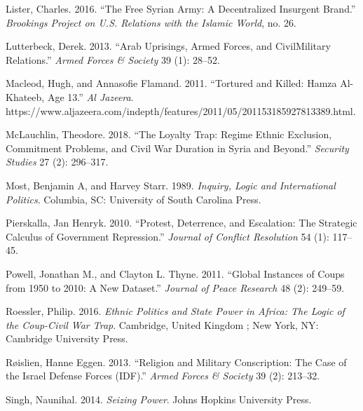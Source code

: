 \documentclass[12pt,]{article}
\begin{document}
\leavevmode\hypertarget{ref-Lister2016}{}%
Lister, Charles. 2016. ``The Free Syrian Army: A Decentralized Insurgent Brand.'' \emph{Brookings Project on U.S. Relations with the Islamic World}, no. 26.

\leavevmode\hypertarget{ref-Lutterbeck2013}{}%
Lutterbeck, Derek. 2013. ``Arab Uprisings, Armed Forces, and CivilMilitary Relations.'' \emph{Armed Forces \& Society} 39 (1): 28--52.

\leavevmode\hypertarget{ref-Macleod2011}{}%
Macleod, Hugh, and Annasofie Flamand. 2011. ``Tortured and Killed: Hamza Al-Khateeb, Age 13.'' \emph{Al Jazeera}. https://www.aljazeera.com/indepth/features/2011/05/201153185927813389.html.

\leavevmode\hypertarget{ref-McLauchlin2018}{}%
McLauchlin, Theodore. 2018. ``The Loyalty Trap: Regime Ethnic Exclusion, Commitment Problems, and Civil War Duration in Syria and Beyond.'' \emph{Security Studies} 27 (2): 296--317.

\leavevmode\hypertarget{ref-Most1989}{}%
Most, Benjamin A, and Harvey Starr. 1989. \emph{Inquiry, Logic and International Politics}. Columbia, SC: University of South Carolina Press.

\leavevmode\hypertarget{ref-Pierskalla2010}{}%
Pierskalla, Jan Henryk. 2010. ``Protest, Deterrence, and Escalation: The Strategic Calculus of Government Repression.'' \emph{Journal of Conflict Resolution} 54 (1): 117--45.

\leavevmode\hypertarget{ref-Powell2011}{}%
Powell, Jonathan M., and Clayton L. Thyne. 2011. ``Global Instances of Coups from 1950 to 2010: A New Dataset.'' \emph{Journal of Peace Research} 48 (2): 249--59.

\leavevmode\hypertarget{ref-Roessler2016}{}%
Roessler, Philip. 2016. \emph{Ethnic Politics and State Power in Africa: The Logic of the Coup-Civil War Trap}. Cambridge, United Kingdom ; New York, NY: Cambridge University Press.

\leavevmode\hypertarget{ref-Roislien2013}{}%
Røislien, Hanne Eggen. 2013. ``Religion and Military Conscription: The Case of the Israel Defense Forces (IDF).'' \emph{Armed Forces \& Society} 39 (2): 213--32.

\leavevmode\hypertarget{ref-Singh2014}{}%
Singh, Naunihal. 2014. \emph{Seizing Power}. Johns Hopkins University Press.
\end{document}
